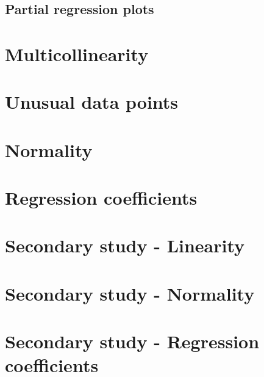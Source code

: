 \documentclass{sigchi}
\begin{document}
\subsection{Partial regression plots}
\hfill \break


\clearpage

\section{Multicollinearity} %
\label{app:multicollinearity}
\hfill \break

\clearpage

\section{Unusual data points} %
\label{sec:unusual_data_points}
\hfill \break

\clearpage

\section{Normality} %
\label{app:normality}
\hfill \break

\clearpage

\section{Regression coefficients} %
\label{sec:regression_coefficients}
\hfill \break

\clearpage

\section{Secondary study - Linearity}
\label{app:sec_linearity}
\hfill \break

\clearpage

\section{Secondary study - Normality} %
\label{sec:sec_normality}
\hfill \break

\clearpage

\section{Secondary study - Regression coefficients}
\label{sec:sec_regression_coefficients}
\hfill \break

\clearpage


\end{document}

